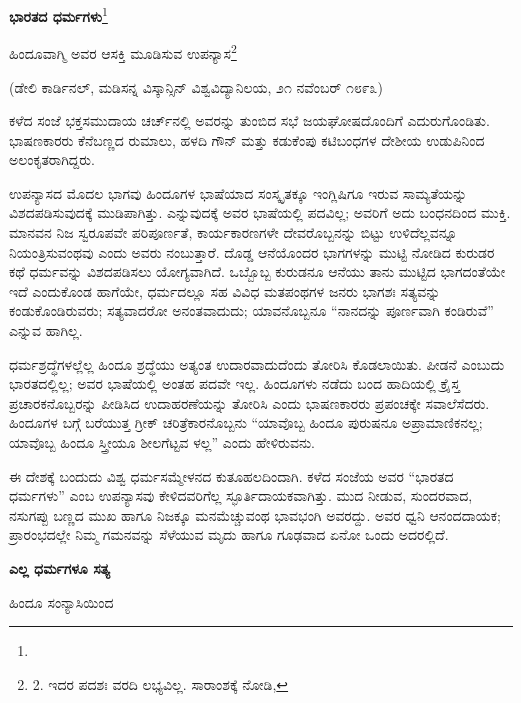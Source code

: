 \begin{center}
\textbf{ಭಾರತದ ಧರ್ಮಗಳು}\footnote{}
\end{center}

\begin{center}
ಹಿಂದೂವಾಗ್ಮಿ  ಅವರ ಆಸಕ್ತಿ ಮೂಡಿಸುವ ಉಪನ್ಯಾಸ\footnote{2. ಇದರ ಪದಶಃ ವರದಿ ಲಭ್ಯವಿಲ್ಲ. ಸಾರಾಂಶಕ್ಕೆ ನೋಡಿ, }
\end{center}

(ಡೇಲಿ ಕಾರ್ಡಿನಲ್, ಮಡಿಸನ್ನ ವಿಸ್ಕಾನ್ಸಿನ್ ವಿಶ್ವವಿದ್ಯಾನಿಲಯ, ೨೧ ನವೆಂಬರ್ ೧೮೯೩)

ಕಳೆದ ಸಂಜೆ ಭಕ್ತಸಮುದಾಯ ಚರ್ಚ್​ನಲ್ಲಿ  ಅವರನ್ನು ತುಂಬಿದ ಸಭೆ ಜಯಘೋಷದೊಂದಿಗೆ ಎದುರುಗೊಂಡಿತು. ಭಾಷಣಕಾರರು ಕೆನೆಬಣ್ಣದ ರುಮಾಲು, ಹಳದಿ ಗೌನ್ ಮತ್ತು ಕಡುಕೆಂಪು ಕಟಿಬಂಧಗಳ ದೇಶೀಯ ಉಡುಪಿನಿಂದ ಅಲಂಕೃತರಾಗಿದ್ದರು.

ಉಪನ್ಯಾಸದ ಮೊದಲ ಭಾಗವು ಹಿಂದೂಗಳ ಭಾಷೆಯಾದ ಸಂಸ್ಕೃತಕ್ಕೂ ಇಂಗ್ಲಿಷಿಗೂ ಇರುವ ಸಾಮ್ಯತೆಯನ್ನು ವಿಶದಪಡಿಸುವುದಕ್ಕೆ ಮುಡಿಪಾಗಿತ್ತು.  ಎನ್ನುವುದಕ್ಕೆ ಅವರ ಭಾಷೆಯಲ್ಲಿ ಪದವಿಲ್ಲ; ಅವರಿಗೆ ಅದು ಬಂಧನದಿಂದ ಮುಕ್ತಿ. ಮಾನವನ ನಿಜ ಸ್ವರೂಪವೇ ಪರಿಪೂರ್ಣತೆ, ಕಾರ್ಯಕಾರಣಗಳೇ ದೇವರೊಬ್ಬನನ್ನು ಬಿಟ್ಟು ಉಳಿದೆಲ್ಲವನ್ನೂ ನಿಯಂತ್ರಿಸುವಂಥವು ಎಂದು ಅವರು ನಂಬುತ್ತಾರೆ. ದೊಡ್ಡ ಆನೆಯೊಂದರ ಭಾಗಗಳನ್ನು ಮುಟ್ಟಿ ನೋಡಿದ ಕುರುಡರ ಕಥೆ ಧರ್ಮವನ್ನು ವಿಶದಪಡಿಸಲು ಯೋಗ್ಯವಾಗಿದೆ. ಒಬ್ಬೊಬ್ಬ ಕುರುಡನೂ ಆನೆಯು ತಾನು ಮುಟ್ಟಿದ ಭಾಗದಂತೆಯೇ ಇದೆ ಎಂದುಕೊಂಡ ಹಾಗೆಯೇ, ಧರ್ಮದಲ್ಲೂ ಸಹ ವಿವಿಧ ಮತಪಂಥಗಳ ಜನರು ಭಾಗಶಃ ಸತ್ಯವನ್ನು ಕಂಡುಕೊಂಡಿರುವರು; ಸತ್ಯವಾದರೋ ಅನಂತವಾದುದು; ಯಾವನೊಬ್ಬನೂ “ನಾನದನ್ನು ಪೂರ್ಣವಾಗಿ ಕಂಡಿರುವೆ” ಎನ್ನುವ ಹಾಗಿಲ್ಲ.

ಧರ್ಮಶ್ರದ್ಧೆಗಳಲ್ಲೆಲ್ಲ ಹಿಂದೂ ಶ್ರದ್ಧೆಯು ಅತ್ಯಂತ ಉದಾರವಾದುದೆಂದು ತೋರಿಸಿ ಕೊಡಲಾಯಿತು. ಪೀಡನೆ ಎಂಬುದು ಭಾರತದಲ್ಲಿಲ್ಲ; ಅವರ ಭಾಷೆಯಲ್ಲಿ ಅಂತಹ ಪದವೇ ಇಲ್ಲ. ಹಿಂದೂಗಳು ನಡೆದು ಬಂದ ಹಾದಿಯಲ್ಲಿ ಕ್ರೈಸ್ತ ಪ್ರಚಾರಕನೊಬ್ಬರನ್ನು ಪೀಡಿಸಿದ ಉದಾಹರಣೆಯನ್ನು ತೋರಿಸಿ ಎಂದು ಭಾಷಣಕಾರರು ಪ್ರಪಂಚಕ್ಕೇ ಸವಾಲೆಸೆದರು. ಹಿಂದೂಗಳ ಬಗ್ಗೆ ಬರೆಯುತ್ತ ಗ್ರೀಕ್ ಚರಿತ್ರೆಕಾರನೊಬ್ಬನು “ಯಾವೊಬ್ಬ ಹಿಂದೂ ಪುರುಷನೂ ಅಪ್ರಾಮಾಣಿಕನಲ್ಲ; ಯಾವೊಬ್ಬ ಹಿಂದೂ ಸ್ತ್ರೀಯೂ ಶೀಲಗೆಟ್ಟವ ಳಲ್ಲ” ಎಂದು ಹೇಳಿರುವನು.

 ಈ ದೇಶಕ್ಕೆ ಬಂದುದು ವಿಶ್ವ ಧರ್ಮಸಮ್ಮೇಳನದ ಕುತೂಹಲದಿಂದಾಗಿ. ಕಳೆದ ಸಂಜೆಯ ಅವರ “ಭಾರತದ ಧರ್ಮಗಳು” ಎಂಬ ಉಪನ್ಯಾಸವು ಕೇಳಿದವರಿಗೆಲ್ಲ ಸ್ಫೂರ್ತಿದಾಯಕವಾಗಿತ್ತು. ಮುದ ನೀಡುವ, ಸುಂದರವಾದ, ನಸುಗಪ್ಪು ಬಣ್ಣದ ಮುಖ ಹಾಗೂ ನಿಜಕ್ಕೂ ಮನಮೆಚ್ಚುವಂಥ ಭಾವಭಂಗಿ ಅವರದ್ದು. ಅವರ ಧ್ವನಿ ಆನಂದದಾಯಕ; ಪ್ರಾರಂಭದಲ್ಲೇ ನಿಮ್ಮ ಗಮನವನ್ನು ಸೆಳೆಯುವ ಮೃದು ಹಾಗೂ ಗೂಢವಾದ ಏನೋ ಒಂದು ಅದರಲ್ಲಿದೆ.

\begin{center}
\textbf{ಎಲ್ಲ ಧರ್ಮಗಳೂ ಸತ್ಯ}
\end{center}

\begin{center}
ಹಿಂದೂ ಸಂನ್ಯಾಸಿಯಿಂದ
\end{center}

